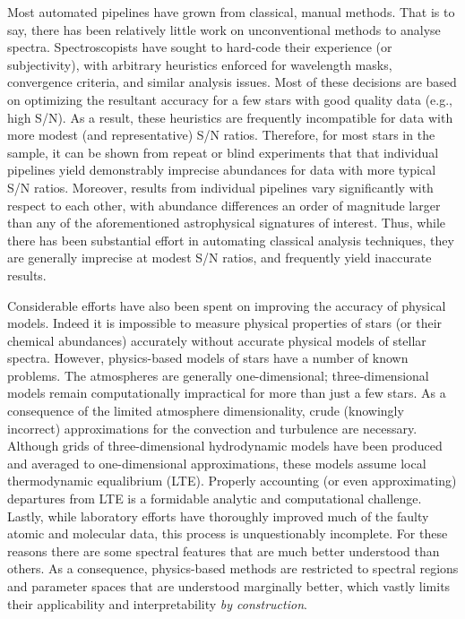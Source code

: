 \documentclass[12pt,preprint]{aastex}
\begin{document}
Most automated pipelines have grown from classical, manual methods.  That is to
say, there has been relatively little work on unconventional methods to analyse
spectra.  Spectroscopists have sought to hard-code their experience (or 
subjectivity), with arbitrary heuristics enforced for wavelength masks, 
convergence criteria, and similar analysis issues.  Most of these decisions are 
based on optimizing the resultant accuracy for a few stars with good 
quality data (e.g., high S/N).  As a result, these heuristics are frequently 
incompatible for data with more modest (and representative) S/N ratios.  
Therefore, for most stars in the sample, it can be shown from repeat or blind 
experiments that that individual pipelines yield demonstrably imprecise 
abundances for data with more typical S/N ratios.  Moreover, results from 
individual pipelines vary significantly with respect to each other, with 
abundance differences an order of magnitude larger than any of the 
aforementioned astrophysical signatures of interest.  Thus, while there has been
substantial effort in automating classical analysis techniques, they are 
generally imprecise at modest S/N ratios, and frequently yield inaccurate 
results.


Considerable efforts have also been spent on improving the accuracy of physical
models.  Indeed it is impossible to measure physical properties of stars (or 
their chemical abundances) accurately without accurate physical models of 
stellar spectra.  However, physics-based models of stars have a number of known
problems.  The atmospheres are generally one-dimensional; three-dimensional
models remain computationally impractical for more than just a few stars.  As a
consequence of the limited atmosphere dimensionality, crude (knowingly 
incorrect) approximations for the convection and turbulence are necessary. 
Although grids of three-dimensional hydrodynamic models have been produced 
and averaged to one-dimensional approximations, these models assume local
thermodynamic equalibrium (LTE).  Properly accounting (or even approximating) 
departures from LTE is a formidable analytic and computational challenge.
Lastly, while laboratory efforts have thoroughly improved much of the faulty
atomic and molecular data, this process is unquestionably incomplete. For these
reasons there are some spectral features that are much better understood than
others.  As a consequence, physics-based methods are restricted to spectral
regions and parameter spaces that are understood marginally better, which vastly
limits their applicability and interpretability \emph{by construction}.
\end{document}
